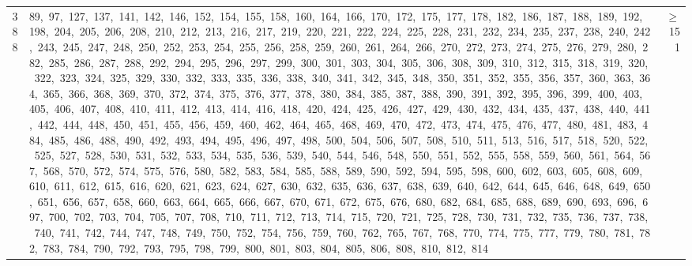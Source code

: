 \begin{longtable}{c|p{}|r}
388 & 89,\ 97,\ 127,\ 137,\ 141,\ 142,\ 146,\ 152,\ 154,\ 155,\ 158,\ 160,\ 164,\ 166,\ 170,\ 172,\ 175,\ 177,\ 178,\ 182,\ 186,\ 187,\ 188,\ 189,\ 192,\ 198,\ 204,\ 205,\ 206,\ 208,\ 210,\ 212,\ 213,\ 216,\ 217,\ 219,\ 220,\ 221,\ 222,\ 224,\ 225,\ 228,\ 231,\ 232,\ 234,\ 235,\ 237,\ 238,\ 240,\ 242,\ 243,\ 245,\ 247,\ 248,\ 250,\ 252,\ 253,\ 254,\ 255,\ 256,\ 258,\ 259,\ 260,\ 261,\ 264,\ 266,\ 270,\ 272,\ 273,\ 274,\ 275,\ 276,\ 279,\ 280,\ 282,\ 285,\ 286,\ 287,\ 288,\ 292,\ 294,\ 295,\ 296,\ 297,\ 299,\ 300,\ 301,\ 303,\ 304,\ 305,\ 306,\ 308,\ 309,\ 310,\ 312,\ 315,\ 318,\ 319,\ 320,\ 322,\ 323,\ 324,\ 325,\ 329,\ 330,\ 332,\ 333,\ 335,\ 336,\ 338,\ 340,\ 341,\ 342,\ 345,\ 348,\ 350,\ 351,\ 352,\ 355,\ 356,\ 357,\ 360,\ 363,\ 364,\ 365,\ 366,\ 368,\ 369,\ 370,\ 372,\ 374,\ 375,\ 376,\ 377,\ 378,\ 380,\ 384,\ 385,\ 387,\ 388,\ 390,\ 391,\ 392,\ 395,\ 396,\ 399,\ 400,\ 403,\ 405,\ 406,\ 407,\ 408,\ 410,\ 411,\ 412,\ 413,\ 414,\ 416,\ 418,\ 420,\ 424,\ 425,\ 426,\ 427,\ 429,\ 430,\ 432,\ 434,\ 435,\ 437,\ 438,\ 440,\ 441,\ 442,\ 444,\ 448,\ 450,\ 451,\ 455,\ 456,\ 459,\ 460,\ 462,\ 464,\ 465,\ 468,\ 469,\ 470,\ 472,\ 473,\ 474,\ 475,\ 476,\ 477,\ 480,\ 481,\ 483,\ 484,\ 485,\ 486,\ 488,\ 490,\ 492,\ 493,\ 494,\ 495,\ 496,\ 497,\ 498,\ 500,\ 504,\ 506,\ 507,\ 508,\ 510,\ 511,\ 513,\ 516,\ 517,\ 518,\ 520,\ 522,\ 525,\ 527,\ 528,\ 530,\ 531,\ 532,\ 533,\ 534,\ 535,\ 536,\ 539,\ 540,\ 544,\ 546,\ 548,\ 550,\ 551,\ 552,\ 555,\ 558,\ 559,\ 560,\ 561,\ 564,\ 567,\ 568,\ 570,\ 572,\ 574,\ 575,\ 576,\ 580,\ 582,\ 583,\ 584,\ 585,\ 588,\ 589,\ 590,\ 592,\ 594,\ 595,\ 598,\ 600,\ 602,\ 603,\ 605,\ 608,\ 609,\ 610,\ 611,\ 612,\ 615,\ 616,\ 620,\ 621,\ 623,\ 624,\ 627,\ 630,\ 632,\ 635,\ 636,\ 637,\ 638,\ 639,\ 640,\ 642,\ 644,\ 645,\ 646,\ 648,\ 649,\ 650,\ 651,\ 656,\ 657,\ 658,\ 660,\ 663,\ 664,\ 665,\ 666,\ 667,\ 670,\ 671,\ 672,\ 675,\ 676,\ 680,\ 682,\ 684,\ 685,\ 688,\ 689,\ 690,\ 693,\ 696,\ 697,\ 700,\ 702,\ 703,\ 704,\ 705,\ 707,\ 708,\ 710,\ 711,\ 712,\ 713,\ 714,\ 715,\ 720,\ 721,\ 725,\ 728,\ 730,\ 731,\ 732,\ 735,\ 736,\ 737,\ 738,\ 740,\ 741,\ 742,\ 744,\ 747,\ 748,\ 749,\ 750,\ 752,\ 754,\ 756,\ 759,\ 760,\ 762,\ 765,\ 767,\ 768,\ 770,\ 774,\ 775,\ 777,\ 779,\ 780,\ 781,\ 782,\ 783,\ 784,\ 790,\ 792,\ 793,\ 795,\ 798,\ 799,\ 800,\ 801,\ 803,\ 804,\ 805,\ 806,\ 808,\ 810,\ 812,\ 814 & $\ge$ 151 \\

\end{longtable}
